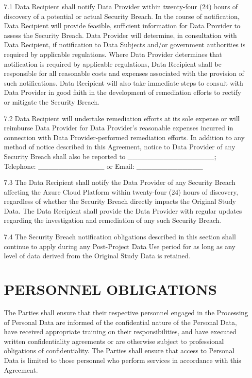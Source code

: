 \documentclass[12pt,letterpaper]{article}
\newcommand{\added}[1]{\textcolor{addcolor}{#1}}
\begin{document}
7.1 Data Recipient shall notify Data Provider within twenty-four (24) hours of discovery of a potential or actual Security Breach. In the course of notification, Data Recipient will provide feasible, sufficient information for Data Provider to assess the Security Breach. Data Provider will determine, in consultation with Data Recipient, if notification to Data Subjects and/or government authorities is required by applicable regulations. Where Data Provider determines that notification is required by applicable regulations, Data Recipient shall be responsible for all reasonable costs and expenses associated with the provision of such notifications. Data Recipient will also take immediate steps to consult with Data Provider in good faith in the development of remediation efforts to rectify or mitigate the Security Breach.

7.2 Data Recipient will undertake remediation efforts at its sole expense or will reimburse Data Provider for Data Provider's reasonable expenses incurred in connection with Data Provider-performed remediation efforts. In addition to any method of notice described in this Agreement, notice to Data Provider of any Security Breach shall also be reported to \_\_\_\_\_\_\_\_\_\_\_\_\_\_\_\_\_; Telephone: \_\_\_\_\_\_\_\_\_\_\_\_\_ or Email: \_\_\_\_\_\_\_\_\_\_\_\_\_

\added{7.3 The Data Recipient shall notify the Data Provider of any Security Breach affecting the Azure Cloud Platform within twenty-four (24) hours of discovery, regardless of whether the Security Breach directly impacts the Original Study Data. The Data Recipient shall provide the Data Provider with regular updates regarding the investigation and remediation of any such Security Breach.}

\added{7.4 The Security Breach notification obligations described in this section shall continue to apply during any Post-Project Data Use period for as long as any level of data derived from the Original Study Data is retained.}

\section{PERSONNEL OBLIGATIONS}

The Parties shall ensure that their respective personnel engaged in the Processing of Personal Data are informed of the confidential nature of the Personal Data, have received appropriate training on their responsibilities, and have executed written confidentiality agreements or are otherwise subject to professional obligations of confidentiality. The Parties shall ensure that access to Personal Data is limited to those personnel who perform services in accordance with this Agreement.
\end{document}
